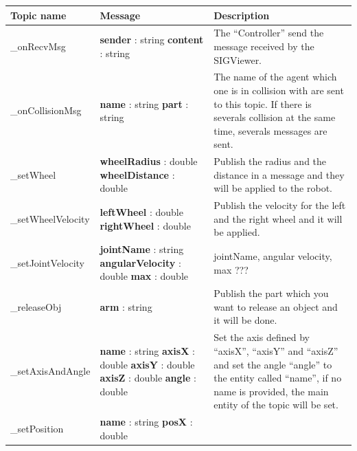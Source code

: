 \documentclass[notitlepage]{report}
\begin{document}
\begin{supertabular}{|p{2.9cm}|p{4.5cm}|p{7cm}|}
	\hline
    Topic name & Message & Description \\
  	\hline
  	\_onRecvMsg &
  		\textbf{sender} : string\newline 
  		\textbf{content} : string
  		\medskip & The ``Controller'' send the message received by the SIGViewer.\\
  	\hline
  	\medskip
  	\_onCollisionMsg &
  		\medskip
  		\textbf{name} : string \newline
  		\textbf{part} : string & The name of the agent which one is in collision with are sent to this topic. If there is severals collision at the same time, severals messages are sent.\\
  	\hline
  	\_setWheel & 
  		\textbf{wheelRadius} : double \newline
  		\textbf{wheelDistance} : double & Publish the radius and the distance in a message and they will be applied to the robot.\\
  	\hline
  	\_setWheelVelocity & 
  		\textbf{leftWheel} : double \newline
  		\textbf{rightWheel} : double
  		& Publish the velocity for the left and the right wheel and it will be applied.\\
  	\hline
  	\_setJointVelocity & 
  		\textbf{jointName} : string\newline
  		\textbf{angularVelocity} : double \newline
  		\textbf{max} : double
  		& jointName, angular velocity, max ???\\
  	\hline
  	\_releaseObj & \textbf{arm} : string & Publish the part which you want to release an object and it will be done.\\
  	\hline
  	\_setAxisAndAngle & 
  		\textbf{name} : string \newline
  		\textbf{axisX} : double \newline
  		\textbf{axisY} : double \newline
  		\textbf{axisZ} : double \newline
  		\textbf{angle} : double
  		& Set the axis defined by ``axisX'', ``axisY'' and ``axisZ'' and set the angle ``angle'' to the entity called ``name'', if no name is provided, the main entity of the topic will be set.\\
  	\hline
  	\_setPosition & 
  		\textbf{name} : string \newline
  		\textbf{posX} : double \newline

\end{supertabular}
\end{document}
